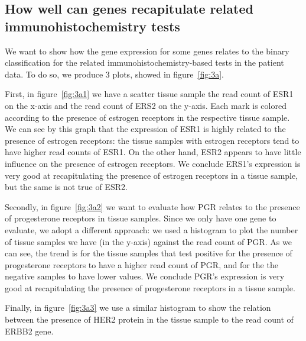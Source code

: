 \documentclass[10pt,twocolumn]{article}\usepackage[]{graphicx}\usepackage[]{color}
\begin{document}
\subsection{How well can genes recapitulate related immunohistochemistry tests} %

We want to show how the gene expression for some genes relates to the binary classification for the related immunohistochemistry-based tests in the patient data. To do so, we produce 3 plots, showed in figure~\ref{fig:3a}.

First, in figure~\ref{fig:3a1} we have a scatter tissue sample the read count of ESR1 on the x-axis and the read count of ERS2 on the y-axis. Each mark is colored according to the presence of estrogen receptors in the respective tissue sample. We can see by this graph that the expression of ESR1 is highly related to the presence of estrogen receptors: the tissue samples with estrogen receptors tend to have higher read counts of ESR1. On the other hand, ESR2 appears to have little influence on the presence of estrogen receptors. We conclude ERS1's expression is very good at recapitulating the presence of estrogen receptors in a tissue sample, but the same is not true of ESR2.

Secondly, in figure~\ref{fig:3a2} we want to evaluate how PGR relates to the presence of progesterone receptors in tissue samples. Since we only have one gene to evaluate, we adopt a different approach: we used a histogram to plot the number of tissue samples we have (in the y-axis) against the read count of PGR. As we can see, the trend is for the tissue samples that test positive for the presence of progesterone receptors to have a higher read count of PGR, and for the the negative samples to have lower values.  We conclude PGR's expression is very good at recapitulating the presence of progesterone receptors in a tissue sample.

Finally, in figure~\ref{fig:3a3} we use a similar histogram to show the relation between the presence of HER2 protein in the tissue sample to the read count of ERBB2 gene.
\end{document}
